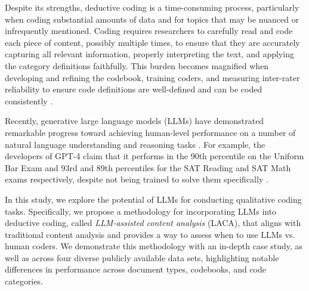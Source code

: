 \documentclass{article}
\begin{document}
Despite its strengths, deductive coding is a time-consuming process, particularly when coding substantial amounts of data \cite{strauss_qualitative_1987} and for topics that may be nuanced or infrequently mentioned. Coding requires researchers to carefully read and code each piece of content, possibly multiple times, to ensure that they are accurately capturing all relevant information, properly interpreting the text, and applying the category definitions faithfully.  This burden becomes magnified when developing and refining the codebook, training coders, and measuring inter-rater reliability to ensure code definitions are well-defined and can be coded consistently \cite{neuendorf_content_2017}. 

Recently, generative large language models (LLMs) \cite{wei2021finetuned, brown_language_2020} have demonstrated remarkable progress toward achieving human-level performance on a number of natural language understanding and reasoning tasks \cite{liang2022holistic}.  For example, the developers of GPT-4 claim that it performs in the 90th percentile on the Uniform Bar Exam and 93rd and 89th percentiles for the SAT Reading and SAT Math exams respectively, despite not being trained to solve them specifically \cite{openai_gpt-4_2023}. 

In this study, we explore the potential of LLMs for conducting qualitative coding tasks. Specifically, we propose a methodology for incorporating LLMs into deductive coding, called \emph{LLM-assisted content analysis} (LACA), that aligns with traditional content analysis and provides a way to assess when to use LLMs vs. human coders. We demonstrate this methodology with an in-depth case study, as well as across four diverse publicly available data sets, highlighting notable differences in performance across document types, codebooks, and code categories.
\end{document}
